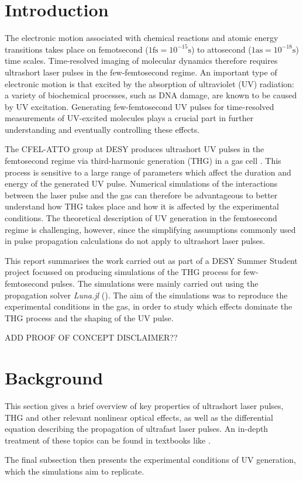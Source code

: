 \documentclass[a4paper]{jpconf}
\begin{document}
\thispagestyle{plain}
\pagestyle{plain}
\setlength{\footskip}{20pt}

\section{Introduction}
The electronic motion associated with chemical reactions and atomic energy transitions takes place on femotsecond ($1 \text{fs} = 10^{-15} \text{s}$) to attosecond ($1 \text{as} = 10^{-18} \text{s}$) time scales. Time-resolved imaging of molecular dynamics therefore requires ultrashort laser pulses in the few-femtosecond regime. An important type of electronic motion is that excited by the absorption of ultraviolet (UV) radiation: a variety of biochemical processes, such as DNA damage, are known to be caused by UV excitation. Generating few-femtosecond UV pulses for time-resolved measurements of UV-excited molecules plays a crucial part in further understanding and eventually controlling these effects. \par 
The CFEL-ATTO group at DESY produces ultrashort UV pulses in the femtosecond regime via third-harmonic generation (THG) in a gas cell \cite{galli2019}. This process is sensitive to a large range of parameters which affect the duration and energy of the generated UV pulse. Numerical simulations of the interactions between the laser pulse and the gas can therefore be advantageous to better understand how THG takes place and how it is affected by the experimental conditions. The theoretical description of UV generation in the femtosecond regime is challenging, however, since the simplifying assumptions commonly used in pulse propagation calculations do not apply to ultrashort laser pulses. \par 
This report summarises the work carried out as part of a DESY Summer Student project focussed on producing simulations of the THG process for few-femtosecond pulses. The simulations were mainly carried out using the propagation solver \textit{Luna.jl} (\cite{brahms2023}). The aim of the simulations was to reproduce the experimental conditions in the gas, in order to study which effects dominate the THG process and the shaping of the UV pulse. \par 
ADD PROOF OF CONCEPT DISCLAIMER??

\section{Background}
This section gives a brief overview of key properties of ultrashort laser pulses,  THG and other relevant nonlinear optical effects, as well as the differential equation describing the propagation of ultrafast laser pulses. An in-depth treatment of these topics can be found in textbooks like \cite{keller2021, new2011}. \par 
The final subsection then presents the experimental conditions of UV generation, which the simulations aim to replicate. 
\end{document}
